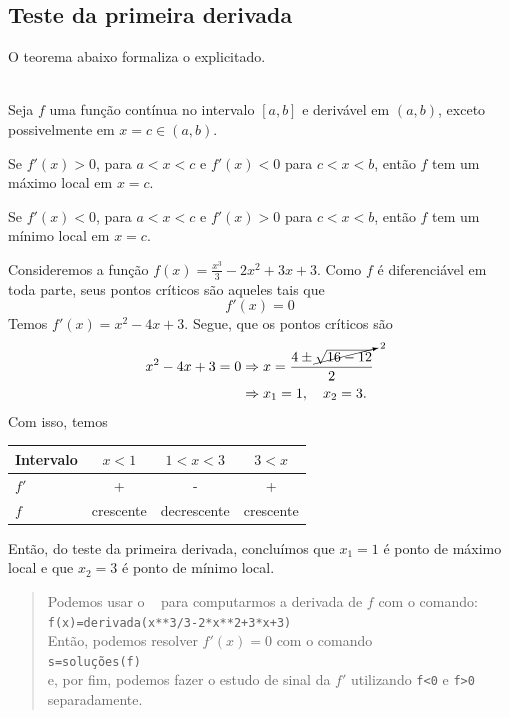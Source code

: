 \cleardoublepage\documentclass[../main.tex]{subfiles}
\begin{document}
\subsection{Teste da primeira derivada}
O teorema abaixo formaliza o explicitado.
\begin{framed}
\begin{teo}~
\\ Seja $f$ uma função contínua no intervalo $[a, b]$ e derivável em  $(a,b)$, exceto possivelmente em $x=c\in (a,b)$.
\begin{compactenum}[(a)]
\item Se $f'(x)>0$, para $a<x<c$ e $f'(x)<0$ para $c<x<b$, então $f$ tem um máximo local em $x=c$.
\item  Se $f'(x)<0$, para $a<x<c$ e $f'(x)>0$ para $c<x<b$, então $f$ tem um mínimo local em $x=c$.
\end{compactenum}
\end{teo}
\end{framed}
\begin{ex}
  Consideremos a função $\displaystyle f(x)=\frac{x^3}{3}-2x^2+3x+3$. Como $f$ é diferenciável em toda parte, seus pontos críticos são aqueles tais que
  \begin{equation}
    f'(x)=0
  \end{equation}
  Temos $f'(x) = x^2 - 4x + 3$. Segue, que os pontos críticos são
  \begin{align*}
    x^2-4x+3=0 &\Rightarrow x = \frac{4\pm \cancelto{2}{\sqrt{16-12}}}{2} \\
    &\Rightarrow x_1 = 1,\quad x_2=3.
  \end{align*}
  Com isso, temos
  \begin{center}
  \begin{tabular}{lccc}\hline
    Intervalo & $x<1$ & $1<x<3$ & $3<x$ \\\hline
    $f'$ & + & - & + \\
    $f$ & crescente & decrescente & crescente\\\hline
  \end{tabular}
\end{center}
  Então, do teste da primeira derivada, concluímos que $x_1=1$ é ponto de máximo local e que $x_2=3$ é ponto de mínimo local.\\
 \begin{quote}
Podemos usar o \geogebra~ para computarmos a derivada de $f$ com o comando:\\
\verb|f(x)=derivada(x**3/3-2*x**2+3*x+3)|\\
  Então, podemos resolver $f'(x)=0$ com o comando\\
\verb+s=soluções(f)+\\
  e, por fim, podemos fazer o estudo de sinal da $f'$ utilizando \verb=f<0= e \verb=f>0= separadamente.
  \end{quote}
\end{ex}
\end{document}
